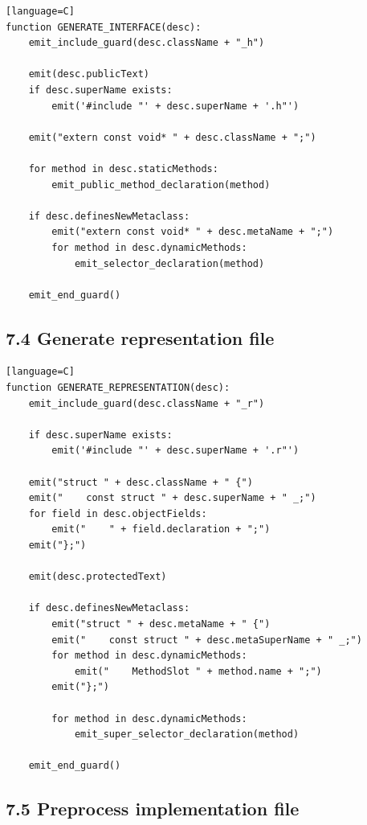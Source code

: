 \documentclass[11pt]{article}
\begin{document}
\begin{verbatim}[language=C]
function GENERATE_INTERFACE(desc):
    emit_include_guard(desc.className + "_h")

    emit(desc.publicText)
    if desc.superName exists:
        emit('#include "' + desc.superName + '.h"')

    emit("extern const void* " + desc.className + ";")

    for method in desc.staticMethods:
        emit_public_method_declaration(method)

    if desc.definesNewMetaclass:
        emit("extern const void* " + desc.metaName + ";")
        for method in desc.dynamicMethods:
            emit_selector_declaration(method)

    emit_end_guard()
\end{verbatim}

\subsection{7.4 Generate representation
file}\label{generate-representation-file}

\begin{verbatim}[language=C]
function GENERATE_REPRESENTATION(desc):
    emit_include_guard(desc.className + "_r")

    if desc.superName exists:
        emit('#include "' + desc.superName + '.r"')

    emit("struct " + desc.className + " {")
    emit("    const struct " + desc.superName + " _;")
    for field in desc.objectFields:
        emit("    " + field.declaration + ";")
    emit("};")

    emit(desc.protectedText)

    if desc.definesNewMetaclass:
        emit("struct " + desc.metaName + " {")
        emit("    const struct " + desc.metaSuperName + " _;")
        for method in desc.dynamicMethods:
            emit("    MethodSlot " + method.name + ";")
        emit("};")

        for method in desc.dynamicMethods:
            emit_super_selector_declaration(method)

    emit_end_guard()
\end{verbatim}

\subsection{7.5 Preprocess implementation
file}\label{preprocess-implementation-file}
\end{document}
